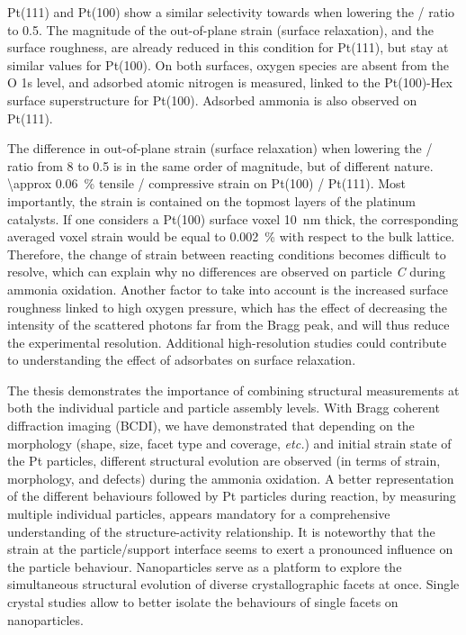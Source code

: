 Pt(111) and Pt(100) show a similar selectivity towards  when lowering the / ratio to \num{0.5}.
The magnitude of the out-of-plane strain (surface relaxation), and the surface roughness, are already reduced in this condition for Pt(111), but stay at similar values for Pt(100).
On both surfaces, oxygen species are absent from the O 1s level, and adsorbed atomic nitrogen is measured, linked to the Pt(100)-Hex surface superstructure for Pt(100).
Adsorbed ammonia is also observed on Pt(111).

The difference in out-of-plane strain (surface relaxation) when lowering the / ratio from \num{8} to \num{0.5} is in the same order of magnitude, but of different nature.
\qty{\approx 0.06}{\percent} tensile / compressive strain on Pt(100) /  Pt(111).
Most importantly, the strain is contained on the topmost layers of the platinum catalysts.
If one considers a Pt(100) surface voxel \qty{10}{\nm} thick, the corresponding averaged voxel strain would be equal to \qty{0.002}{\percent} with respect to the bulk lattice.
Therefore, the change of strain between reacting conditions becomes difficult to resolve, which can explain why no differences are observed on particle \textit{C} during ammonia oxidation.
Another factor to take into account is the increased surface roughness linked to high oxygen pressure, which has the effect of decreasing the intensity of the scattered photons far from the Bragg peak, and will thus reduce the experimental resolution.
Additional high-resolution studies could contribute to understanding the effect of adsorbates on surface relaxation.

The thesis demonstrates the importance of combining structural measurements at both the individual particle and particle assembly levels.
With Bragg coherent diffraction imaging (BCDI), we have demonstrated that depending on the morphology (shape, size, facet type and coverage, \textit{etc.}) and initial strain state of the Pt particles, different structural evolution are observed (in terms of strain, morphology, and defects) during the ammonia oxidation.
A better representation of the different behaviours followed by Pt particles during reaction, by measuring multiple individual particles, appears mandatory for a comprehensive understanding of the structure-activity relationship.
It is noteworthy that the strain at the particle/support interface seems to exert a pronounced influence on the particle behaviour.
Nanoparticles serve as a platform to explore the simultaneous structural evolution of diverse crystallographic facets at once.
Single crystal studies allow to better isolate the behaviours of single facets on nanoparticles.

